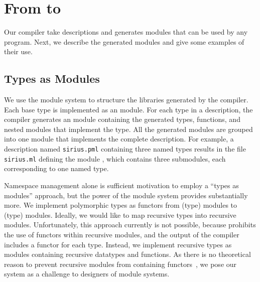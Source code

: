 \section{From \padsmlbig{} to \ocamlbig{}}
\label{sec:padsml-impl}
Our \padsml{} compiler take descriptions and generates \ocaml{}
modules that can be used by any \ocaml{} program.  Next, we
describe the generated modules and give some examples of their use.

\subsection{Types as Modules}
\label{sec:gen-code}

We use the \ocaml{} module system to structure the libraries generated
by the \padsml{} compiler.  Each \padsml{} base type is implemented as
an \ocaml{} module.  For each \padsml{} type in a description, the
\padsml{} compiler generates an \ocaml{} module containing the
generated \ocaml{} types, functions, and nested modules that implement
the \padsml{} type.  All the generated modules are grouped into one
module that implements the complete description.  For example, a
\padsml{} description named \texttt{sirius.pml} containing three named
types results in the \ocaml{} file \texttt{sirius.ml} defining the
module , which contains three submodules, each
corresponding to one named type.

Namespace management alone is sufficient motivation to employ a
``types as modules'' approach, but the power of the \ml{} module
system provides substantially more.  We implement polymorphic
\padsml{} types as functors from (type) modules to (type) modules.
Ideally, we would like to map recursive \padsml{} types into recursive
modules.  Unfortunately, this approach currently is not possible, because
\ocaml{} prohibits the use of functors within recursive modules,
and the output of the \padsml{} compiler includes a functor for each
type.  Instead, we implement recursive types as modules containing
recursive datatypes and functions.  As there is no theoretical reason
to prevent recursive modules from containing functors~\cite{dreyer-thesis}, we
pose our system as a challenge to designers of module systems.

